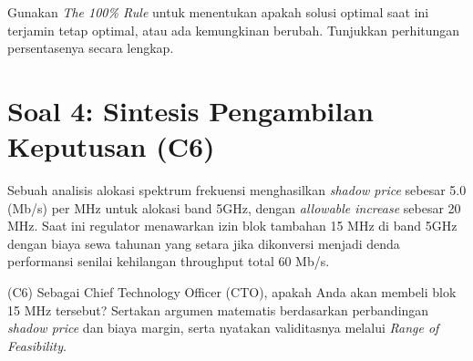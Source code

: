 \documentclass[11pt, a4paper]{article}
\begin{document}
Gunakan \textit{The 100\% Rule} untuk menentukan apakah solusi optimal saat ini terjamin tetap optimal, atau ada kemungkinan berubah. Tunjukkan perhitungan persentasenya secara lengkap.

\section*{Soal 4: Sintesis Pengambilan Keputusan (C6)}
Sebuah analisis alokasi spektrum frekuensi menghasilkan \textit{shadow price} sebesar 5.0 (Mb/s) per MHz untuk alokasi band 5GHz, dengan \textit{allowable increase} sebesar 20 MHz.
Saat ini regulator menawarkan izin blok tambahan 15 MHz di band 5GHz dengan biaya sewa tahunan yang setara jika dikonversi menjadi denda performansi senilai kehilangan throughput total 60 Mb/s.

(C6) Sebagai Chief Technology Officer (CTO), apakah Anda akan membeli blok 15 MHz tersebut? Sertakan argumen matematis berdasarkan perbandingan \textit{shadow price} dan biaya margin, serta nyatakan validitasnya melalui \textit{Range of Feasibility}.
\end{document}
